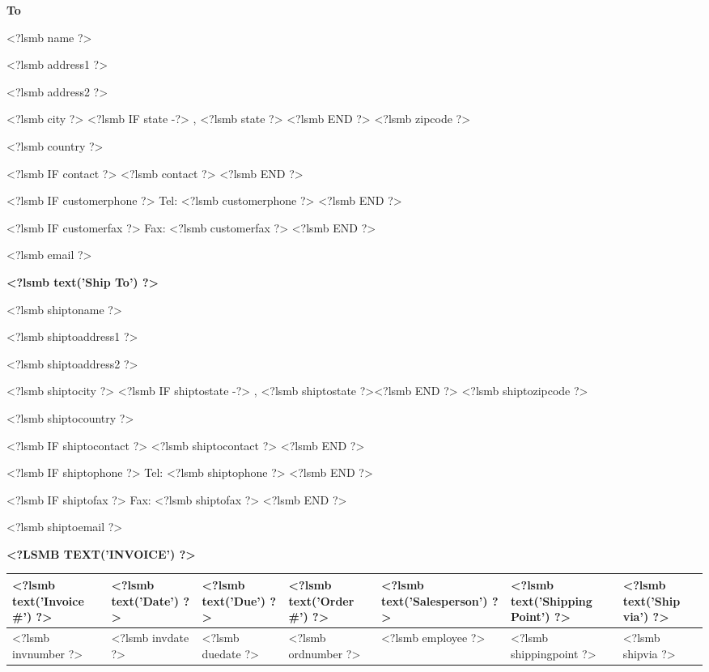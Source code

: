 \documentclass{scrartcl}
\begin{document}
\parbox[t]{.5\textwidth}{
\textbf{To}
\vspace{0.3cm}

<?lsmb name ?>

<?lsmb address1 ?>

<?lsmb address2 ?>

<?lsmb city ?>
<?lsmb IF state -?>
\hspace{-0.1cm}, <?lsmb state ?> <?lsmb END ?> <?lsmb zipcode ?>

<?lsmb country ?>

\vspace{0.3cm}

<?lsmb IF contact ?>
<?lsmb contact ?>
\vspace{0.2cm}
<?lsmb END ?>

<?lsmb IF customerphone ?>
Tel: <?lsmb customerphone ?>
<?lsmb END ?>

<?lsmb IF customerfax ?>
Fax: <?lsmb customerfax ?>
<?lsmb END ?>

<?lsmb email ?>
}
\parbox[t]{.5\textwidth}{
\textbf{<?lsmb text('Ship To') ?>}
\vspace{0.3cm}

<?lsmb shiptoname ?>

<?lsmb shiptoaddress1 ?>

<?lsmb shiptoaddress2 ?>

<?lsmb shiptocity ?>
<?lsmb IF shiptostate -?>
\hspace{-0.1cm}, <?lsmb shiptostate ?><?lsmb END ?> <?lsmb shiptozipcode ?>

<?lsmb shiptocountry ?>

\vspace{0.3cm}

<?lsmb IF shiptocontact ?>
<?lsmb shiptocontact ?>
\vspace{0.2cm}
<?lsmb END ?>

<?lsmb IF shiptophone ?>
Tel: <?lsmb shiptophone ?>
<?lsmb END ?>

<?lsmb IF shiptofax ?>
Fax: <?lsmb shiptofax ?>
<?lsmb END ?>

<?lsmb shiptoemail ?>
}
\hfill

\vspace{1cm}

\textbf{\MakeUppercase{<?lsmb text('Invoice') ?>}}
\hfill

\vspace{1cm}

\begin{tabularx}{\textwidth}{*{7}{|X}|} \hline
  \textbf{<?lsmb text('Invoice #') ?>} & \textbf{<?lsmb text('Date') ?>} 
      & \textbf{<?lsmb text('Due') ?>} & \textbf{<?lsmb text('Order #') ?>}
      & \textbf{<?lsmb text('Salesperson') ?>} 
      & \textbf{<?lsmb text('Shipping Point') ?>} 
      & \textbf{<?lsmb text('Ship via') ?>} \\ [0.5em]
  \hline
  <?lsmb invnumber ?> & <?lsmb invdate ?> & <?lsmb duedate ?> & <?lsmb ordnumber ?> & <?lsmb employee ?>
  & <?lsmb shippingpoint ?> & <?lsmb shipvia ?> \\
  \hline
\end{tabularx}
\end{document}
